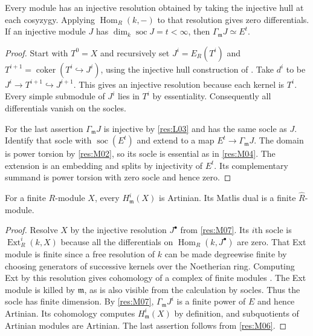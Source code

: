 \begin{proposition}\label{res:M07}
Every module has an injective resolution obtained by taking the
injective hull at each cosyzygy. Applying $\operatorname{Hom}_R(k,-)$
to that resolution gives zero differentials. If an injective module
$J$ has $\dim_k\operatorname{soc}J=t<\infty$, then
$\Gamma_{\mathfrak m}J\simeq E^t$.
\end{proposition}
\begin{proof}
Start with $T^0=X$ and recursively set $J^i=E_R(T^i)$ and
$T^{i+1}=\operatorname{coker}(T^i\hookrightarrow J^i)$, using the
injective hull construction of \cite[ALG-03-C02-S03]{p103}.
Take $d^i$ to be $J^i\to T^{i+1}\hookrightarrow J^{i+1}$.
This gives an injective resolution because each kernel is $T^i$.
Every simple submodule of $J^i$ lies in $T^i$ by essentiality.
Consequently all differentials vanish on the socles.

For the last assertion $\Gamma_{\mathfrak m}J$ is injective by
\ref{res:L03} and has the same socle as $J$. Identify that socle with
$\operatorname{soc}(E^t)$ and extend to a map
$E^t\to \Gamma_{\mathfrak m}J$. The domain is power torsion by
\ref{res:M02}, so its socle is essential as in \ref{res:M04}.
The extension is an embedding and splits by injectivity of $E^t$.
Its complementary summand is power torsion with zero socle and hence
zero.
\end{proof}

\begin{theorem}\label{res:M08}
For a finite $R$-module $X$, every $H^i_{\mathfrak m}(X)$ is Artinian.
Its Matlis dual is a finite $\widehat R$-module.
\end{theorem}
\begin{proof}
Resolve $X$ by the injective resolution $J^\bullet$ from
\ref{res:M07}. Its $i$th socle is $\operatorname{Ext}^i_R(k,X)$
because all the differentials on $\operatorname{Hom}_R(k,J^\bullet)$
are zero. That Ext module is finite since a free resolution of $k$
can be made degreewise finite by choosing generators of successive
kernels over the Noetherian ring. Computing Ext by this resolution
gives cohomology of a complex of finite modules
\cite[ALG-10-C03-R01 and S01]{p103}. The Ext module is killed by $\mathfrak m$,
as is also visible from the calculation by socles. Thus the socle
has finite dimension. By \ref{res:M07}, $\Gamma_{\mathfrak m}J^i$
is a finite power of $E$ and hence Artinian. Its cohomology computes
$H^i_{\mathfrak m}(X)$ by definition, and subquotients of Artinian
modules are Artinian. The last assertion follows from \ref{res:M06}.
\end{proof}
